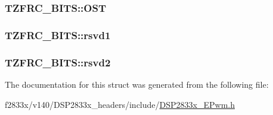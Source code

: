 \subsubsection[{O\+S\+T}]{ T\+Z\+F\+R\+C\+\_\+\+B\+I\+T\+S\+::\+O\+S\+T}\label{struct_t_z_f_r_c___b_i_t_s_a2826e90b0c2cc347930bf3805519bd10}
\hypertarget{struct_t_z_f_r_c___b_i_t_s_aef9312e1fcf1d83836cb3c081477eadc}{}
\subsubsection[{rsvd1}]{ T\+Z\+F\+R\+C\+\_\+\+B\+I\+T\+S\+::rsvd1}\label{struct_t_z_f_r_c___b_i_t_s_aef9312e1fcf1d83836cb3c081477eadc}
\hypertarget{struct_t_z_f_r_c___b_i_t_s_ac63811b78881cd2ef7ad907d51f15a74}{}
\subsubsection[{rsvd2}]{ T\+Z\+F\+R\+C\+\_\+\+B\+I\+T\+S\+::rsvd2}\label{struct_t_z_f_r_c___b_i_t_s_ac63811b78881cd2ef7ad907d51f15a74}


The documentation for this struct was generated from the following file\+:\begin{DoxyCompactItemize}
\item 
f2833x/v140/\+D\+S\+P2833x\+\_\+headers/include/\hyperlink{_d_s_p2833x___e_pwm_8h}{D\+S\+P2833x\+\_\+\+E\+Pwm.\+h}\end{DoxyCompactItemize}
